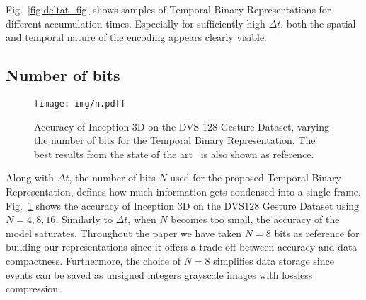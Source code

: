 \documentclass[a4paper,conference]{IEEEtran}
\begin{document}
Fig.~\ref{fig:deltat_fig} shows samples of Temporal Binary Representations for different accumulation times. Especially for sufficiently high $\Delta t$, both the spatial and temporal nature of the encoding appears clearly visible.

\subsection{Number of bits}
\begin{figure}[!t]
	\centering
	\texttt{[image: img/n.pdf]}
	\caption{Accuracy of Inception 3D on the DVS 128 Gesture Dataset, varying the number of bits for the Temporal Binary Representation. The best results from the state of the art~\cite{ghosh2019spatiotemporal} is also shown as reference.}
	\label{fig:n}
\end{figure}
Along with $\Delta t$, the number of bits $N$ used for the proposed Temporal Binary Representation, defines how much information gets condensed into a single frame. Fig.~\ref{fig:n} shows the accuracy of Inception 3D on the DVS128 Gesture Dataset using $N={4,8,16}$. Similarly to $\Delta t$, when $N$ becomes too small, the accuracy of the model saturates. Throughout the paper we have taken $N=8$ bits as reference for building our representations since it offers a trade-off between accuracy and data compactness. Furthermore, the choice of $N=8$ simplifies data storage since events can be saved as unsigned integers grayscale images with lossless compression.
\end{document}
